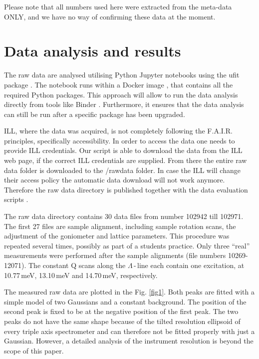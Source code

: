 \documentclass[aps,pra,reprint,amsmath,amssymb,superscriptaddress,showkeys]{revtex4-1}
\begin{document}
Please note that all numbers used here were extracted from the meta-data ONLY, and we have no way of confirming these data at the moment. 


\section{Data analysis and results}

The raw data are analysed utilising Python Jupyter notebooks \cite{jupyter} using the ufit package \cite{ufit}.
The notebook \cite{data-evaluation} runs within a Docker image \cite{Docker}, that contains all the required Python packages.
This approach will allow to run the data analysis \cite{data-docker} directly from tools like Binder \cite{binder}.
Furthermore, it ensures that the data analysis can still be run after a specific package has been upgraded.

ILL, where the data was acquired, is not completely following the F.A.I.R. principles, specifically accessibility. 
In order to access the data one needs to provide ILL credentials. 
Our script is able to download the data from the ILL web page, if the correct ILL credentials are supplied. 
From there the entire raw data folder is downloaded to the /rawdata folder. 
In case the ILL will change their access policy the automatic data download will not work anymore. 
Therefore the raw data directory is published together with the data evaluation scripts \cite{data-evaluation}.

The raw data directory contains 30 data files from number 102942 till 102971. 
The first 27 files are sample alignment, including sample rotation scans, the adjustment of the goniometer and lattice parameters. 
This procedure was repeated several times, possibly as part of a students practice.
Only three ``real'' measurements were performed after the sample alignments (file numbers 10269-12071).
The constant Q scans along the $\Lambda$\,-\,line each contain one excitation, at 10.77\,meV, 13.10\,meV and 14.70\,meV, respectively. 

The measured raw data are plotted in the Fig. \ref{fig1}.
Both peaks are fitted with a simple model of two Gaussians and a constant background. 
The position of the second peak is fixed to be at the negative position of the first peak. 
The two peaks do not have the same shape because of the tilted resolution ellipsoid of every triple axis spectrometer and can therefore not be fitted properly with just a Gaussian. 
However, a detailed analysis of the instrument resolution is beyond the scope of this paper.
\end{document}
